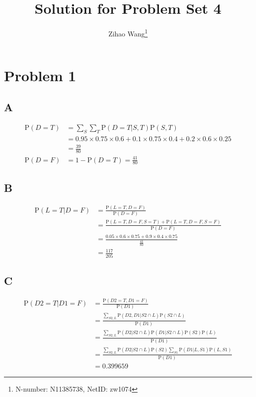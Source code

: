 \documentclass[11pt]{article}
\author{Zihao Wang\footnote{N-number: N11385738, NetID: zw1074}
	}
\title{\textbf{Solution for Problem Set 4}}
\renewcommand{\P}{\mbox{P}}
\begin{document}
	\maketitle
	\section*{Problem 1}
	\subsection*{A}
	\begin{align*}
		\P(D = T) &= \sum_{S}^{}\sum_{T}\P(D=T|S,T)\P(S,T)\\
		&= 0.95\times 0.75\times 0.6 + 0.1\times 0.75\times 0.4 + 0.2\times 0.6\times 0.25\\
		&= \frac{39}{80}\\
		\P(D = F) &= 1-\P(D = T) = \frac{41}{80}
	\end{align*}
	\subsection*{B}
	\begin{align*}
		\P(L=T|D=F) &= \frac{\P(L=T,D=F)}{\P(D=F)}\\
		&= \frac{\P(L=T,D=F,S=T) + \P(L=T,D=F,S=F)}{\P(D=F)}\\
		&= \frac{0.05\times 0.6\times 0.75 + 0.9\times 0.4 \times 0.75}{\frac{41}{80}}\\
		&= \frac{117}{205}
	\end{align*}
	\subsection*{C}
	\begin{align*}
		\P(D2=T|D1=F) &= \frac{\P(D2=T,D1=F)}{\P(D1)}\\
		&= \frac{\sum_{S2,L}^{}\P(D2,D1|S2\cap L)\P(S2\cap L)}{\P(D1)}\\
		&= \frac{\sum_{S2,L}^{}\P(D2|S2\cap L)\P(D1|S2\cap L)\P(S2)\P(L)}{\P(D1)}\\
		&= \frac{\sum_{S2,L}^{}\P(D2|S2\cap L)\P(S2)\sum_{S1}^{}\P(D1|L,S1)\P(L,S1)}{\P(D1)}\\
		&= 0.399659
	\end{align*}
\end{document}

